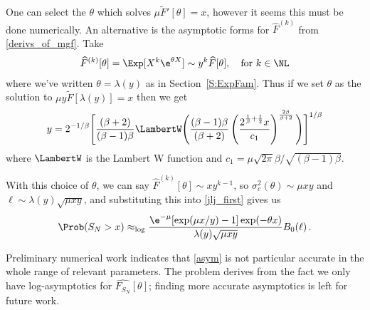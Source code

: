 One can select the $\theta$ which solves $\mu \widetilde{F}'[\theta]=x$, however it seems this must be done numerically.
An alternative is the asymptotic forms for $\widehat{F}^{(k)}$ from \eqref{derivs_of_mgf}. Take
\begin{align} \label{deriv_asymptotics}
	\widehat{F}^{(k)}[\theta] = \Exp[X^k\e^{\theta X}]\sim y^k\widehat{F}[\theta], \quad \text{for } k \in \NL
\end{align}
where we've written $\theta=\lambda(y)$ as in Section~\ref{S:ExpFam}. Thus if we set $\theta$ as the solution to $\mu y \widetilde{F}[\lambda(y)] = x$ then we get
\begin{equation} \label{y_approx}
y = 2^{-1/\beta } \Bigg[ \frac{(\beta +2) }{(\beta -1) \beta } \LambertW\Bigg( \frac{(\beta -1) \beta }{(\beta +2)} \left(\frac{2^{\frac{1}{\beta }+\frac{1}{2}} x}{c_1}\right)^{\frac{2 \beta }{\beta +2}} \Bigg) \Bigg]^{1/\beta }
\end{equation}
where $\LambertW$ is the Lambert W function and $c_1 = \mu \sqrt{2 \pi } \beta   / \sqrt{(\beta -1) \beta }$.

With this choice of $\theta$, we can say $\widehat{F}^{(k)}[\theta] \sim x y^{k-1}$, so $\sigma_c^2(\theta) \sim \mu x y$ and $\ell \sim \lambda(y) \sqrt{\mu x y}$, and substituting this into \eqref{jlj_first} gives us
\begin{equation} \label{asym}
\Prob(S_N > x)
	\approx_{\log} \frac{
		\e^{-\mu} [ \exp ( \mu x / y ) - 1 ] \exp ( -\theta x )
	}{
		\lambda(y) \sqrt{\mu x y}
	} B_0(\ell) \,.
\end{equation}

Preliminary numerical work indicates that \eqref{asym} is not particular accurate in the whole range of relevant parameters.
The problem derives from the fact we only have log-asymptotics for $\widehat{F_{S_N}}[\theta]$; finding more accurate asymptotics is left for future work.


